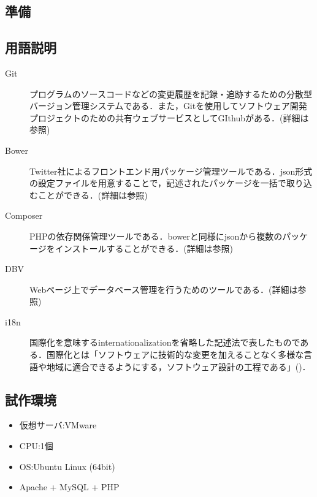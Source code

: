 \documentclass[a4paper]{jarticle}
\begin{document}
\begin{multicols}{2}
\section{準備}

\subsection{用語説明}
\begin{description}
\item[Git]プログラムのソースコードなどの変更履歴を記録・追跡するための分散型バージョン管理システムである．また，Gitを使用してソフトウェア開発プロジェクトのための共有ウェブサービスとしてGIthubがある．(詳細は\cite{git}参照)
\end{description}

\begin{description}
\item[Bower]Twitter社によるフロントエンド用パッケージ管理ツールである．json形式の設定ファイルを用意することで，記述されたパッケージを一括で取り込むことができる．(詳細は\cite{bower}参照)
\end{description}

\begin{description}
\item[Composer] PHPの依存関係管理ツールである．bowerと同様にjsonから複数のパッケージをインストールすることができる．(詳細は\cite{composer}参照)

\end{description}

\begin{description}
\item[DBV]  Webページ上でデータベース管理を行うためのツールである．(詳細は\cite{dbv}参照)
\end{description}

\begin{description}
\item[i18n] 国際化を意味するinternationalizationを省略した記述法で表したものである．国際化とは「ソフトウェアに技術的な変更を加えることなく多様な言語や地域に適合できるようにする，ソフトウェア設計の工程である」(\cite{i18n})．
\end{description}

\subsection{試作環境}
\begin{itemize}
\item 仮想サーバ:VMware
\item CPU:1個
\item OS:Ubuntu Linux (64bit)
\item Apache + MySQL + PHP
\end{itemize}


\end{multicols}
\end{document}

